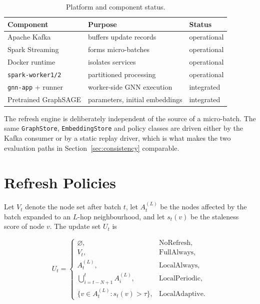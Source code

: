 \documentclass[conference]{IEEEtran}
\begin{document}
\begin{table}[t]
\centering
\small
\caption{Platform and component status.}
\label{tab:platform}
\begin{tabular}{@{}p{2.4cm}p{3.4cm}l@{}}
\toprule
Component & Purpose & Status \\
\midrule
Apache Kafka & buffers update records & operational \\
Spark Streaming & forms micro-batches & operational \\
Docker runtime & isolates services & operational \\
\texttt{spark-worker1/2} & partitioned processing & operational \\
\texttt{gnn-app} + runner & worker-side GNN execution & integrated \\
Pretrained GraphSAGE & parameters, initial embeddings & integrated \\
\bottomrule
\end{tabular}
\end{table}

The refresh engine is deliberately independent of the source of a micro-batch.
The same \texttt{GraphStore}, \texttt{EmbeddingStore} and policy classes are
driven either by the Kafka consumer or by a static replay driver, which is what
makes the two evaluation paths in Section~\ref{sec:consistency} comparable.

\section{Refresh Policies}

Let $V_t$ denote the node set after batch $t$, let $A_t^{(L)}$ be the nodes
affected by the batch expanded to an $L$-hop neighbourhood, and let $s_t(v)$ be
the staleness score of node $v$. The update set $U_t$ is

\begin{equation}
U_t =
\begin{cases}
\varnothing, & \text{NoRefresh},\\[2pt]
V_t, & \text{FullAlways},\\[2pt]
A_t^{(L)}, & \text{LocalAlways},\\[2pt]
\bigcup_{i=t-N+1}^{t} A_i^{(L)}, & \text{LocalPeriodic},\\[2pt]
\{v \in A_t^{(L)} : s_t(v) > \tau\}, & \text{LocalAdaptive}.
\end{cases}
\end{equation}
\end{document}
